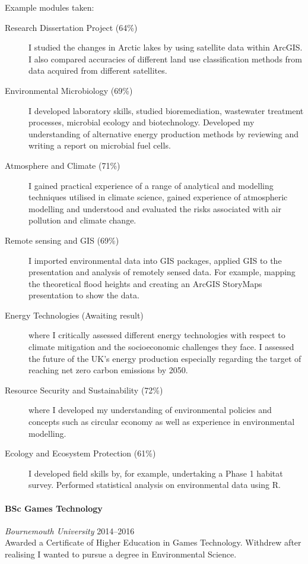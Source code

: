 \documentclass[11pt,a4paper]{article}
\newcommand{\centry}[3]{\paragraph{#1} \textit{#2}%
\hfill#3\\[2pt]}
\begin{document}
Example modules taken:
\begin{description}
\item[Research Dissertation Project (64\%)] I studied the changes in Arctic
  lakes by using satellite data within ArcGIS. I also compared accuracies of
  different land use classification methods from data acquired from different
  satellites.  
\item[Environmental Microbiology (69\%)] I developed laboratory skills, studied
  bioremediation, wastewater treatment processes, microbial ecology and
  biotechnology. Developed my understanding of alternative energy production
  methods by reviewing and writing a report on microbial fuel cells.
\item[Atmosphere and Climate (71\%)]  I gained practical experience of a range of
  analytical and modelling techniques utilised in climate science, gained
  experience of atmospheric modelling and understood and evaluated the risks
  associated with air pollution and climate change.
\item[Remote sensing and GIS (69\%)] I imported environmental data into GIS
  packages, applied GIS to the presentation and analysis of remotely sensed
  data. For example, mapping the theoretical flood heights and creating an
  ArcGIS StoryMaps presentation to show the data.  
  \item[Energy Technologies (Awaiting result)] where I
  critically assessed different energy technologies with respect to climate
  mitigation and the socioeconomic challenges they face. I assessed the future
  of the UK’s energy production especially regarding the target of reaching net
  zero carbon emissions by 2050.  
  \item[Resource Security and Sustainability (72\%)] where I
  developed my understanding of environmental policies and concepts such as
  circular economy as well as experience in environmental modelling. 
\item[Ecology and Ecosystem Protection (61\%)] I developed field skills by, for
  example, undertaking a Phase 1 habitat survey. Performed statistical analysis
  on environmental data using R.
\end{description}


\centry{BSc Games Technology}{Bournemouth University}{2014--2016}
Awarded a Certificate of Higher Education in Games Technology. Withdrew after 
realising I wanted to pursue a degree in Environmental Science.
\end{document}
